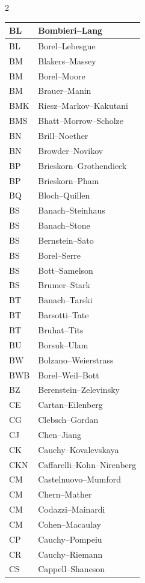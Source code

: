 \documentclass{amsart}
\numberwithin{equation}{section}
\theoremstyle{plain}
\numberwithin{equation}{section}
\theoremstyle{remark}
\begin{document}
\begin{multicols}{2}
{\begin{longtable}{l|l}
BL & Bombieri--Lang\\ \hline
BL & Borel--Lebesgue\\ \hline
BM  & Blakers--Massey\\ \hline
BM & Borel--Moore\\ \hline
BM & Brauer--Manin\\ \hline
BMK & Riesz--Markov--Kakutani\\ \hline
BMS & Bhatt--Morrow--Scholze\\ \hline
BN & Brill--Noether\\ \hline
BN & Browder--Novikov\\ \hline
BP & Brieskorn--Grothendieck\\ \hline
BP & Brieskorn--Pham\\ \hline
BQ & Bloch--Quillen\\ \hline
BS & Banach--Steinhaus\\ \hline
BS & Banach--Stone\\ \hline
BS & Bernstein--Sato\\ \hline
BS & Borel--Serre\\ \hline
BS & Bott--Samelson\\ \hline
BS & Brumer--Stark\\ \hline
BT & Banach--Tarski\\ \hline
BT & Barsotti--Tate\\ \hline
BT & Bruhat--Tits\\ \hline
BU & Borsuk--Ulam\\ \hline
BW & Bolzano--Weierstrass\\ \hline
BWB & Borel--Weil--Bott\\ \hline
BZ & Berenstein--Zelevinsky\\ \hline
CE & Cartan--Eilenberg\\ \hline
CG & Clebsch--Gordan\\ \hline
CJ & Chen--Jiang\\ \hline
CK & Cauchy--Kovalevskaya\\ \hline
CKN & Caffarelli--Kohn--Nirenberg\\ \hline
CM & Castelnuovo--Mumford\\ \hline
CM & Chern--Mather\\ \hline
CM & Codazzi--Mainardi\\ \hline
CM & Cohen--Macaulay\\ \hline
CP &  Cauchy--Pompeiu\\ \hline
CR & Cauchy--Riemann\\ \hline
CS & Cappell--Shaneson\\ \hline

\end{longtable}}
\end{multicols}
\end{document}
